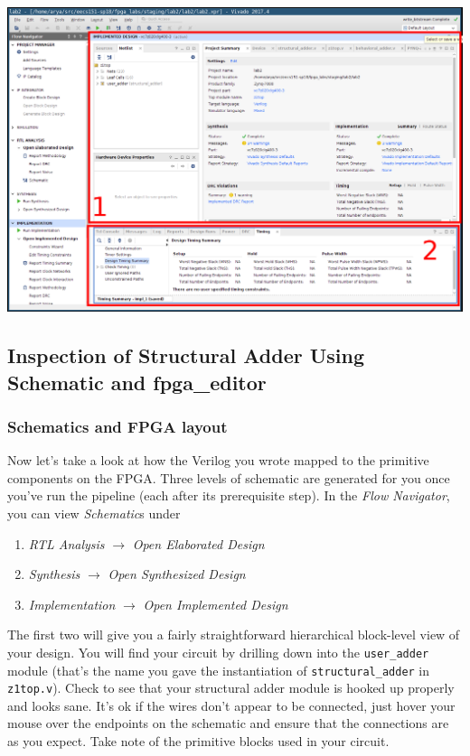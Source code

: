 \documentclass[11pt]{article}
\begin{document}
\begin{center}
  \includegraphics[width=\textwidth]{figs/vivado_project_summary.png}
\end{center}

\subsection{Inspection of Structural Adder Using Schematic and fpga\_editor}
\subsubsection{Schematics and FPGA layout}
Now let's take a look at how the Verilog you wrote mapped to the primitive components on the FPGA. Three levels of schematic are generated for you once you've run the pipeline (each after its prerequisite step). In the \emph{Flow Navigator}, you can view \emph{Schematic}s under

\begin{enumerate}
  \item \emph{RTL Analysis} $\rightarrow$ \emph{Open Elaborated Design}
  \item \emph{Synthesis} $\rightarrow$ \emph{Open Synthesized Design}
  \item \emph{Implementation} $\rightarrow$ \emph{Open Implemented Design}
\end{enumerate}

The first two will give you a fairly straightforward hierarchical block-level view of your design. You will find your circuit by drilling down into the \verb|user_adder| module (that's the name you gave the instantiation of \verb|structural_adder| in \verb|z1top.v|). Check to see that your structural adder module is hooked up properly and looks sane. It's ok if the wires don't appear to be connected, just hover your mouse over the endpoints on the schematic and ensure that the connections are as you expect. Take note of the primitive blocks used in your circuit.
\end{document}
